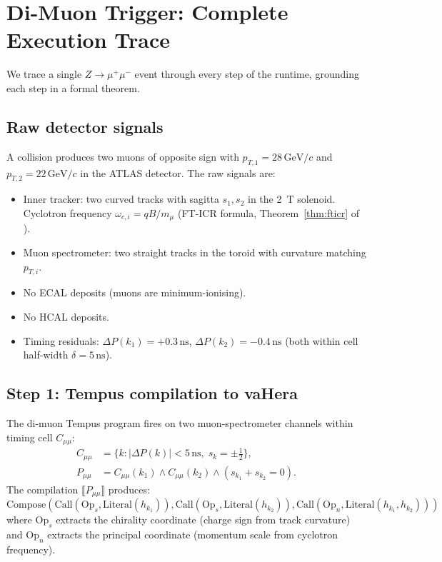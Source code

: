 \documentclass[twocolumn,10pt,a4paper]{article}
\theoremstyle{thmstyle}
\theoremstyle{definition}
\theoremstyle{remark}
\newcommand{\DeltaP}{\Delta P}
\newcommand{\vLit}[1]{\mathrm{Literal}(#1)}
\newcommand{\vCall}[2]{\mathrm{Call}(#1,#2)}
\newcommand{\vComp}[1]{\mathrm{Compose}(#1)}
\begin{document}
\section{Di-Muon Trigger: Complete Execution Trace}
\label{sec:dimuon}

We trace a single $Z \to \mu^+\mu^-$ event through every step of the
runtime, grounding each step in a formal theorem.

\subsection{Raw detector signals}

A collision produces two muons of opposite sign with
$p_{T,1} = 28\,\mathrm{GeV}/c$ and $p_{T,2} = 22\,\mathrm{GeV}/c$
in the ATLAS detector. The raw signals are:
\begin{itemize}[nosep]
\item Inner tracker: two curved tracks with sagitta $s_1, s_2$
  in the 2~T solenoid. Cyclotron frequency
  $\omega_{c,i} = qB/m_\mu$ (FT-ICR formula,
  Theorem~\ref{thm:fticr} of \citealt{companion:spectrometer}).
\item Muon spectrometer: two straight tracks in the toroid with
  curvature matching $p_{T,i}$.
\item No ECAL deposits (muons are minimum-ionising).
\item No HCAL deposits.
\item Timing residuals: $\DeltaP(k_1) = +0.3\,\mathrm{ns}$,
  $\DeltaP(k_2) = -0.4\,\mathrm{ns}$ (both within cell half-width
  $\delta = 5\,\mathrm{ns}$).
\end{itemize}

\subsection{Step 1: Tempus compilation to vaHera}

The di-muon Tempus program fires on two muon-spectrometer channels
within timing cell $C_{\mu\mu}$:
\begin{align}
C_{\mu\mu} &= \{k : |\DeltaP(k)| < 5\,\mathrm{ns},\; s_k = \pm\tfrac{1}{2}\},
\nonumber\\
P_{\mu\mu} &= C_{\mu\mu}(k_1) \wedge C_{\mu\mu}(k_2)
  \wedge (s_{k_1} + s_{k_2} = 0). \nonumber
\end{align}
The compilation $\llbracket P_{\mu\mu}\rrbracket$ produces:
\[
\vComp{
  \vCall{\mathrm{Op}_s}{\vLit{h_{k_1}}},
  \vCall{\mathrm{Op}_s}{\vLit{h_{k_2}}},
  \vCall{\mathrm{Op}_n}{\vLit{h_{k_1}, h_{k_2}}}
}
\]
where $\mathrm{Op}_s$ extracts the chirality coordinate (charge sign from
track curvature) and $\mathrm{Op}_n$ extracts the principal coordinate
(momentum scale from cyclotron frequency).
\end{document}
